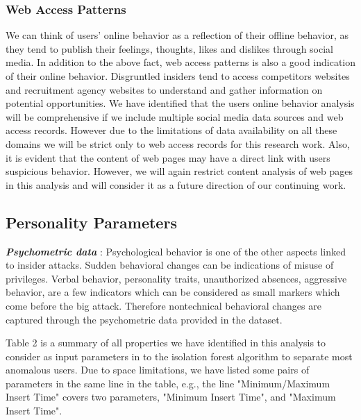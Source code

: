 \documentclass[conference,draftclsnofoot,onecolumn]{IEEEtran}%
\begin{document}
\subsubsection{Web Access Patterns}
We can think of users' online behavior as a reflection of their offline behavior, as they tend to publish their feelings, thoughts, likes and dislikes through social media. In addition to the above fact, web access patterns is also a good indication of their online behavior. Disgruntled insiders tend to access competitors websites and recruitment agency websites to understand and gather information on potential opportunities. We have identified that the users online behavior analysis will be comprehensive if we include multiple social media data sources and web access records. However due to the limitations of data availability on all these domains we will be strict only to web access records for this research work. Also, it is evident that the content of web pages may have a direct link with users suspicious behavior. However, we will again restrict content analysis of web pages in this analysis and will consider it as a future direction of our continuing work.

\subsection{Personality Parameters}
\textbf{\textit{Psychometric data }}:
Psychological behavior is one of the other aspects linked to insider attacks. Sudden behavioral changes can be indications of misuse of privileges. Verbal behavior, personality traits, unauthorized absences, aggressive behavior, are a few indicators which can be considered as small markers which come before the big attack. Therefore nontechnical behavioral changes are captured through the psychometric data provided in the dataset.
	
Table 2 is a summary of all properties we have identified in this analysis to consider as input parameters in to the isolation forest algorithm to separate most anomalous users. Due to space limitations, we have listed some pairs of parameters in the same line in the table, e.g., the line "Minimum/Maximum Insert Time" covers two parameters,  "Minimum Insert Time", and "Maximum Insert Time".
\end{document}
